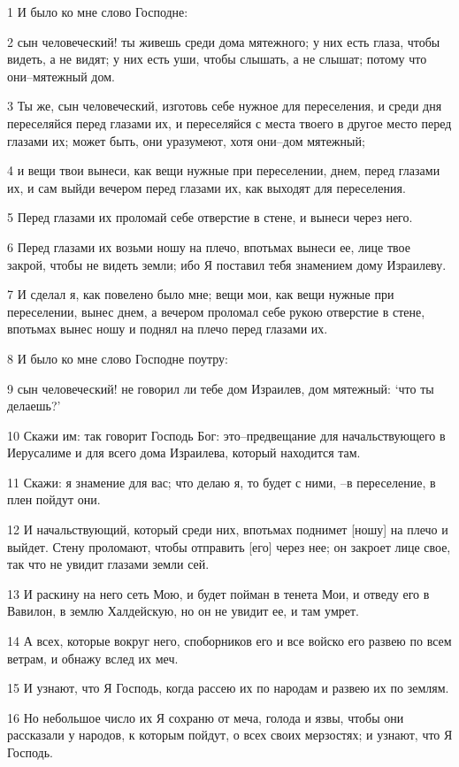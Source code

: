 \par 1 И было ко мне слово Господне:
\par 2 сын человеческий! ты живешь среди дома мятежного; у них есть глаза, чтобы видеть, а не видят; у них есть уши, чтобы слышать, а не слышат; потому что они--мятежный дом.
\par 3 Ты же, сын человеческий, изготовь себе нужное для переселения, и среди дня переселяйся перед глазами их, и переселяйся с места твоего в другое место перед глазами их; может быть, они уразумеют, хотя они--дом мятежный;
\par 4 и вещи твои вынеси, как вещи нужные при переселении, днем, перед глазами их, и сам выйди вечером перед глазами их, как выходят для переселения.
\par 5 Перед глазами их проломай себе отверстие в стене, и вынеси через него.
\par 6 Перед глазами их возьми ношу на плечо, впотьмах вынеси ее, лице твое закрой, чтобы не видеть земли; ибо Я поставил тебя знамением дому Израилеву.
\par 7 И сделал я, как повелено было мне; вещи мои, как вещи нужные при переселении, вынес днем, а вечером проломал себе рукою отверстие в стене, впотьмах вынес ношу и поднял на плечо перед глазами их.
\par 8 И было ко мне слово Господне поутру:
\par 9 сын человеческий! не говорил ли тебе дом Израилев, дом мятежный: `что ты делаешь?'
\par 10 Скажи им: так говорит Господь Бог: это--предвещание для начальствующего в Иерусалиме и для всего дома Израилева, который находится там.
\par 11 Скажи: я знамение для вас; что делаю я, то будет с ними, --в переселение, в плен пойдут они.
\par 12 И начальствующий, который среди них, впотьмах поднимет [ношу] на плечо и выйдет. Стену проломают, чтобы отправить [его] через нее; он закроет лице свое, так что не увидит глазами земли сей.
\par 13 И раскину на него сеть Мою, и будет пойман в тенета Мои, и отведу его в Вавилон, в землю Халдейскую, но он не увидит ее, и там умрет.
\par 14 А всех, которые вокруг него, споборников его и все войско его развею по всем ветрам, и обнажу вслед их меч.
\par 15 И узнают, что Я Господь, когда рассею их по народам и развею их по землям.
\par 16 Но небольшое число их Я сохраню от меча, голода и язвы, чтобы они рассказали у народов, к которым пойдут, о всех своих мерзостях; и узнают, что Я Господь.
